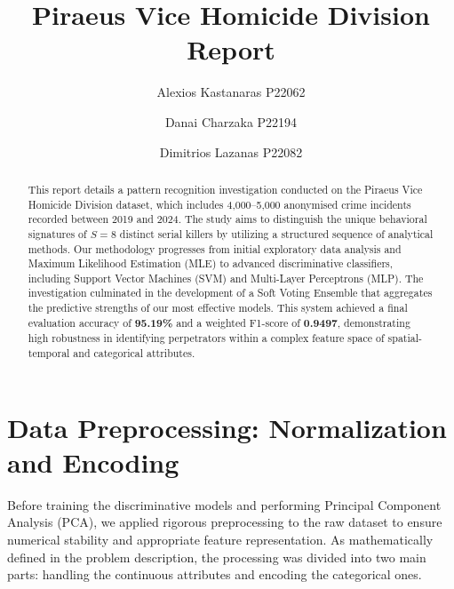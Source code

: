\documentclass{article}
\title{\textbf{Piraeus Vice Homicide Division Report}}
\author{Alexios Kastanaras P22062}
\author{Danai Charzaka P22194}
\author{Dimitrios Lazanas P22082}
\affil{Contact email for the group: \href{mailto:alexioskast@gmail.com}{alexioskast@gmail.com}}
\begin{document}
\maketitle

\begin{abstract}
This report details a pattern recognition investigation conducted on the Piraeus Vice Homicide Division dataset, which includes 4,000--5,000 anonymised crime incidents recorded between 2019 and 2024. The study aims to distinguish the unique behavioral signatures of $S=8$ distinct serial killers by utilizing a structured sequence of analytical methods. Our methodology progresses from initial exploratory data analysis and Maximum Likelihood Estimation (MLE) to advanced discriminative classifiers, including Support Vector Machines (SVM) and Multi-Layer Perceptrons (MLP). The investigation culminated in the development of a Soft Voting Ensemble that aggregates the predictive strengths of our most effective models. This system achieved a final evaluation accuracy of \textbf{95.19\%} and a weighted F1-score of \textbf{0.9497}, demonstrating high robustness in identifying perpetrators within a complex feature space of spatial-temporal and categorical attributes.
\end{abstract}

\section*{Data Preprocessing: Normalization and Encoding}
Before training the discriminative models and performing Principal Component Analysis (PCA), we applied rigorous preprocessing to the raw dataset to ensure numerical stability and appropriate feature representation. As mathematically defined in the problem description, the processing was divided into two main parts: handling the continuous attributes and encoding the categorical ones.
\end{document}

